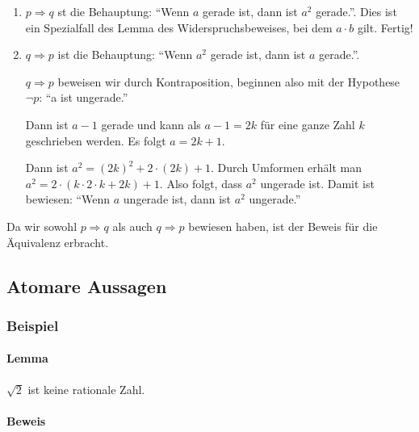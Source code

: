 \documentclass[10pt,a4paper,twoside,twocolumn]{article}
\begin{document}
	\begin{enumerate}
		\item $ p \Rightarrow q $ st die Behauptung: “Wenn $ a $ gerade ist, dann ist $ a^2 $ gerade.”. Dies ist ein Spezialfall des Lemma des Widerspruchsbeweises, bei dem $ a \cdot b $ gilt. Fertig!
		\item $ q \Rightarrow p $ ist die Behauptung: “Wenn $ a^2 $ gerade ist, dann ist $ a $ gerade.”.
		
		$ q \Rightarrow p $ beweisen wir durch Kontraposition, beginnen also mit der Hypothese $ \neg p $: “a ist ungerade.”
		
		Dann ist $ a - 1 $ gerade und kann als $ a - 1 = 2k $ für eine ganze Zahl $ k $ geschrieben werden. Es folgt $ a = 2k + 1 $.
		
		Dann ist $ a^2 = (2k)^2 + 2 \cdot (2k) + 1 $. Durch Umformen erhält man $ a^2 = 2 \cdot (k \cdot 2 \cdot k + 2k) + 1 $. Also folgt, dass $ a^2 $ ungerade ist. Damit ist bewiesen: “Wenn $ a $ ungerade ist, dann ist $ a^2 $ ungerade.”
	\end{enumerate}

	Da wir sowohl $ p \Rightarrow q $ als auch $ q \Rightarrow p $ bewiesen haben, ist der Beweis für die Äquivalenz erbracht.
	
	\subsection{Atomare Aussagen}
	
	\subsubsection{Beispiel}
	
	\paragraph{Lemma} $ \sqrt{2} $ ist keine rationale Zahl.
	
	\paragraph{Beweis}
	
\end{document}
